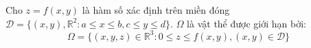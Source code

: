 \documentclass[preview]{standalone}
\begin{document}
\parbox{6cm}{Cho $z = f(x, y)$ là hàm số xác định trên miền đóng $\mathcal{D} = \{(x,y), \mathbb{R}^2 : a \leq x \leq b, c \leq y \leq d\}$. $\Omega$ là vật thể được giới hạn bởi:\\ $$\Omega = \{(x,y,z) \in \mathbb{R}^3 : 0 \leq z \leq f(x,y), (x,y) \in \mathcal{D}\}$$}
\end{document}
